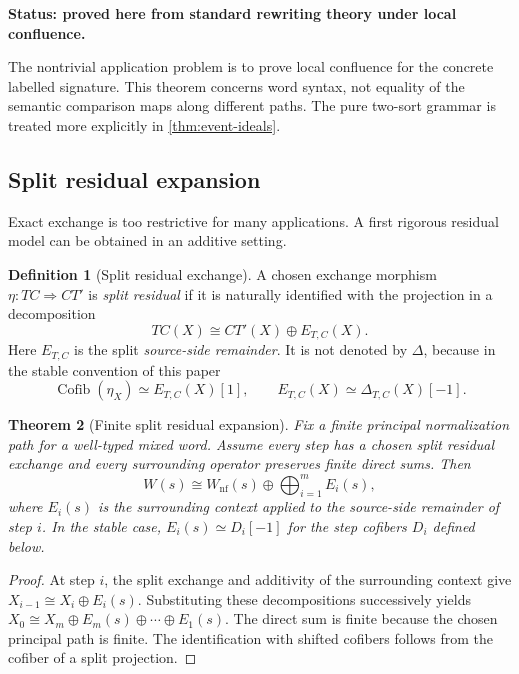 \documentclass[11pt]{article}
\newtheorem{theorem}{Theorem}[section]
\theoremstyle{definition}
\newtheorem{definition}[theorem]{Definition}
\theoremstyle{remark}
\newcommand{\Cofib}{\operatorname{Cofib}}
\newcommand{\status}[1]{\textbf{Status: #1.}}
\begin{document}
\status{proved here from standard rewriting theory under local confluence}

The nontrivial application problem is to prove local confluence for the concrete labelled signature. This theorem concerns word syntax, not equality of the semantic comparison maps along different paths. The pure two-sort grammar is treated more explicitly in \cref{thm:event-ideals}.

\subsection{Split residual expansion}

Exact exchange is too restrictive for many applications. A first rigorous residual model can be obtained in an additive setting.

\begin{definition}[Split residual exchange]
A chosen exchange morphism $\eta:TC\Rightarrow CT'$ is \emph{split residual} if it is naturally identified with the projection in a decomposition
\[
TC(X)\cong CT'(X)\oplus E_{T,C}(X).
\]
Here $E_{T,C}$ is the split \emph{source-side remainder}. It is not denoted by $\Delta$, because in the stable convention of this paper
\[
\Cofib(\eta_X)\simeq E_{T,C}(X)[1],
\qquad E_{T,C}(X)\simeq\Delta_{T,C}(X)[-1].
\]
\end{definition}

\begin{theorem}[Finite split residual expansion]\label{thm:split-expansion}
Fix a finite principal normalization path for a well-typed mixed word. Assume every step has a chosen split residual exchange and every surrounding operator preserves finite direct sums. Then
\[
W(s)\cong W_{\mathrm{nf}}(s)\oplus\bigoplus_{i=1}^m E_i(s),
\]
where $E_i(s)$ is the surrounding context applied to the source-side remainder of step $i$. In the stable case, $E_i(s)\simeq D_i[-1]$ for the step cofibers $D_i$ defined below.
\end{theorem}

\begin{proof}
At step $i$, the split exchange and additivity of the surrounding context give
$X_{i-1}\cong X_i\oplus E_i(s)$. Substituting these decompositions successively yields
$X_0\cong X_m\oplus E_m(s)\oplus\cdots\oplus E_1(s)$.
The direct sum is finite because the chosen principal path is finite. The identification with shifted cofibers follows from the cofiber of a split projection.
\end{proof}
\end{document}
